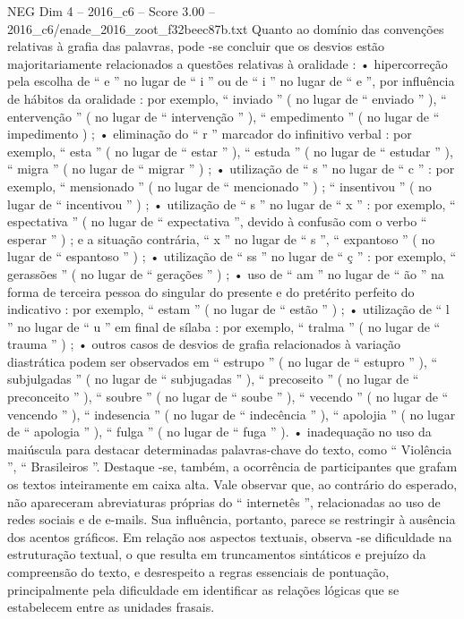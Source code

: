 \begin{textsample}{NEG Dim 4 – 2016\_c6 – Score 3.00 – 2016\_c6/enade\_2016\_zoot\_f32beec87b.txt}
Quanto ao domínio das convenções relativas à grafia das palavras, pode -se concluir que os desvios estão majoritariamente relacionados a questões relativas à oralidade : • hipercorreção pela escolha de “ e ” no lugar de “ i ” ou de “ i ” no lugar de “ e ”, por influência de hábitos da oralidade : por exemplo, “ inviado ” ( no lugar de “ enviado ” ), “ entervenção ” ( no lugar de “ intervenção ” ), “ empedimento ” ( no lugar de “ impedimento ) ; • eliminação do “ r ” marcador do infinitivo verbal : por exemplo, “ esta ” ( no lugar de “ estar ” ), “ estuda ” ( no lugar de “ estudar ” ), “ migra ” ( no lugar de “ migrar ” ) ; • utilização de “ s ” no lugar de “ c ” : por exemplo, “ mensionado ” ( no lugar de “ mencionado ” ) ; “ insentivou ” ( no lugar de “ incentivou ” ) ; • utilização de “ s ” no lugar de “ x ” : por exemplo, “ espectativa ” ( no lugar de “ expectativa ”, devido à confusão com o verbo “ esperar ” ) ; e a situação contrária, “ x ” no lugar de “ s ”, “ expantoso ” ( no lugar de “ espantoso ” ) ; • utilização de “ ss ” no lugar de “ ç ” : por exemplo, “ gerassões ” ( no lugar de “ gerações ” ) ; • uso de “ am ” no lugar de “ ão ” na forma de terceira pessoa do singular do presente e do pretérito perfeito do indicativo : por exemplo, “ estam ” ( no lugar de “ estão ” ) ; • utilização de “ l ” no lugar de “ u ” em final de sílaba : por exemplo, “ tralma ” ( no lugar de “ trauma ” ) ; • outros casos de desvios de grafia relacionados à variação diastrática podem ser observados em “ estrupo ” ( no lugar de “ estupro ” ), “ subjulgadas ” ( no lugar de “ subjugadas ” ), “ precoseito ” ( no lugar de “ preconceito ” ), “ soubre ” ( no lugar de “ soube ” ), “ vecendo ” ( no lugar de “ vencendo ” ), “ indesencia ” ( no lugar de “ indecência ” ), “ apolojia ” ( no lugar de “ apologia ” ), “ fulga ” ( no lugar de “ fuga ” ). • inadequação no uso da maiúscula para destacar determinadas palavras-chave do texto, como “ Violência ”, “ Brasileiros ”.
Destaque -se, também, a ocorrência de participantes que grafam os textos inteiramente em caixa alta.
Vale observar que, ao contrário do esperado, não apareceram abreviaturas próprias do “ internetês ”, relacionadas ao uso de redes sociais e de e-mails.
Sua influência, portanto, parece se restringir à ausência dos acentos gráficos.
Em relação aos aspectos textuais, observa -se dificuldade na estruturação textual, o que resulta em truncamentos sintáticos e prejuízo da compreensão do texto, e desrespeito a regras essenciais de pontuação, principalmente pela dificuldade em identificar as relações lógicas que se estabelecem entre as unidades frasais.

\end{textsample}
